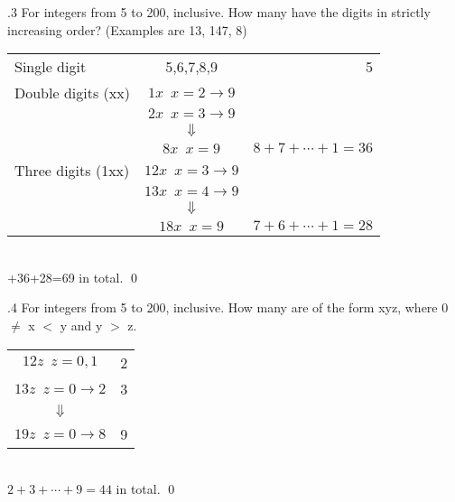\documentclass[
               handout,
               ]{beamer}
\begin{document}
        \begin{frame}[c]{\subsecname.3}
            For integers from 5 to 200, inclusive. How many have the digits in strictly increasing order? (Examples are 13, 147, 8)\\$\;$\\\pause          
                \begin{tabular}{lcr}
                     Single digit		& 5,6,7,8,9 	& 5 	\\
                     Double digits (xx)
                                & $ 1x\;\ x = 2 \rightarrow 9$ & \\
                                & $ 2x\;\ x = 3 \rightarrow 9$ &  	\\
                                & $ \Downarrow $ 	          &  	\\
                                & $ 8x\;\ x = 9 $ 	          & $ 8 + 7 + \cdots + 1 = 36 $ 	\\
                     Three digits (1xx)
                                & $ 12x\;\ x = 3 \rightarrow 9$ & \\
                                & $ 13x\;\ x = 4 \rightarrow 9$ &  	\\
                                & $ \Downarrow $ 	          &  	\\
                                & $ 18x\;\ x = 9 $ 	          & $ 7 + 6 + \cdots + 1 = 28 $ 	\\
                \end{tabular}\\$\;$\\+36+28=69 in total. \qed
        \end{frame}
    
        \begin{frame}[c]{\subsecname.4}
            For integers from 5 to 200, inclusive. How many are of the form xyz, where 0 $\neq$ x $<$ y and y $>$ z.\\$\;$\\\pause
            \centering
                \begin{tabular}{cr}
                     $ 12z\;\ z = 0,1$               & 2 \\
                     $ 13z\;\ z = 0 \rightarrow 2$   & 3 \\
                     $ \Downarrow $                  &  \\
                     $ 19z\;\ z = 0 \rightarrow 8$   & 9 
                \end{tabular}\\$\;$\\\pause
                $2+3+\cdots+9=44$ in total. \qed
        \end{frame}
\end{document}
